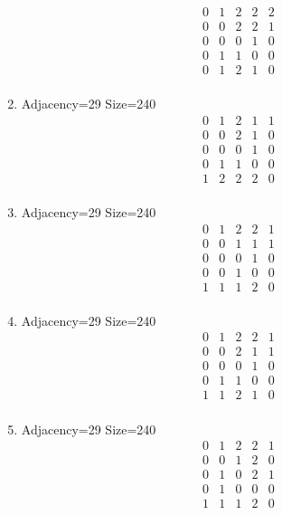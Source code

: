 \documentclass[12pt]{article}
\begin{document}
\begin{multicols}{3}
\begin{enumerate}
\begin{equation*}
\begin{array}{ccccc}
0&1&2&2&2\\
0&0&2&2&1\\
0&0&0&1&0\\
0&1&1&0&0\\
0&1&2&1&0\\
\end{array}
\end{equation*}
\item Adjacency=29 Size=240
\begin{equation*}
\begin{array}{ccccc}
0&1&2&1&1\\
0&0&2&1&0\\
0&0&0&1&0\\
0&1&1&0&0\\
1&2&2&2&0\\
\end{array}
\end{equation*}
\item Adjacency=29 Size=240
\begin{equation*}
\begin{array}{ccccc}
0&1&2&2&1\\
0&0&1&1&1\\
0&0&0&1&0\\
0&0&1&0&0\\
1&1&1&2&0\\
\end{array}
\end{equation*}
\item Adjacency=29 Size=240
\begin{equation*}
\begin{array}{ccccc}
0&1&2&2&1\\
0&0&2&1&1\\
0&0&0&1&0\\
0&1&1&0&0\\
1&1&2&1&0\\
\end{array}
\end{equation*}
\item Adjacency=29 Size=240
\begin{equation*}
\begin{array}{ccccc}
0&1&2&2&1\\
0&0&1&2&0\\
0&1&0&2&1\\
0&1&0&0&0\\
1&1&1&2&0\\
\end{array}

\end{equation*}
\end{enumerate}
\end{multicols}
\end{document}
